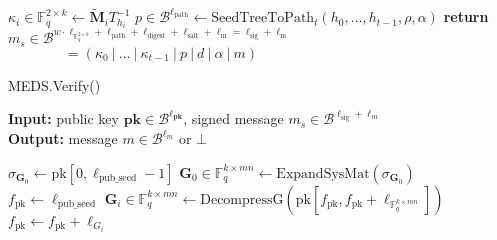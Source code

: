 \begin{algorithm}[H]
\begin{algorithmic}[1]
        \State $\kappa_i \in \mathds{F}_q^{2 \times k} \gets \tilde{\textbf{M}}_i T_{h_i}^{-1}$
    \EndIf
\EndFor
\State $p \in \mathcal{B}^{\ell_\text{path}} \gets \text{SeedTreeToPath}_t(h_0, \ldots, h_{t-1}, \rho, \alpha)$
\State \textbf{return} $m_s \in \mathcal{B}^{w \cdot \ell_{\mathds{F}_q^{2 \times k}} + \ell_\text{path} + \ell_\text{digest} + \ell_\text{salt} + \ell_\text{m} = \ell_\text{sig} + \ell_\text{m}}$\\
$\quad\quad\quad\quad= (\kappa_0~|~\ldots~|~\kappa_{t-1}~|~p~|~d~|~\alpha~|~m)$
\end{algorithmic}
\end{algorithm}

\begin{algorithm}[H]
\caption{MEDS.Verify()}\label{alg:medsverify}
\hspace*{\algorithmicindent} \textbf{Input:} public key $\textbf{pk} \in \mathcal{B}^{\ell_\textbf{pk}}$, signed message $m_s \in \mathcal{B}^{\ell_\text{sig} + \ell_m}$\\
\hspace*{\algorithmicindent} \textbf{Output:} message $m \in \mathcal{B}^{\ell_m}$ or $\bot$
\begin{algorithmic}[1]
\State $\sigma_{\textbf{G}_0} \gets \text{pk}[0, \ell_\text{pub\_seed} - 1]$
\State $\textbf{G}_0 \in \mathds{F}_q^{k \times mn} \gets \text{ExpandSysMat}(\sigma_{\textbf{G}_0})$
\State $f_\text{pk} \gets \ell_\text{pub\_seed}$
    \State $\textbf{G}_i \in \mathds{F}_q^{k \times mn} \gets \text{DecompressG}(\text{pk}[f_\text{pk}, f_\text{pk} + \ell_{\mathds{F}_q^{k \times mn}}])$
    \State $f_\text{pk} \gets f_\text{pk} + \ell_{G_i}$
\EndFor



\end{algorithmic}
\end{algorithm}
